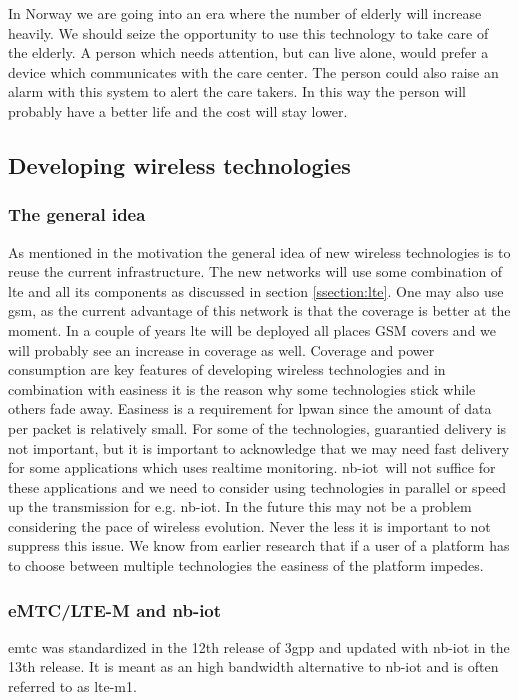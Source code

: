 \documentclass[USenglish]{ifimaster}  %
\begin{document}
In Norway we are going into an era where the number of elderly will increase heavily. We should seize the opportunity to use this technology to take care of the elderly. A person which needs attention, but can live alone, would prefer a device which communicates with the care center. The person could also raise an alarm with this system to alert the care takers. In this way the person will probably have a better life and the cost will stay lower.

\subsection{Developing wireless technologies} \label{ssection:wirelesstech}
\subsubsection{The general idea}
As mentioned in the motivation the general idea of new wireless technologies is to reuse the current infrastructure. The new networks will use some combination of \acrshort{lte} and all its components as discussed in section \vref{ssection:lte}. One may also use \acrshort{gsm}, as the current advantage of this network is that the coverage is better at the moment. In a couple of years \acrshort{lte} will be deployed all places GSM covers and we will probably see an increase in coverage as well. Coverage and power consumption are key features of developing wireless technologies and in combination with easiness it is the reason why some technologies stick while others fade away. Easiness is a requirement for \acrshort{lpwan} since the amount of data per packet is relatively small. For some of the technologies, guarantied delivery is not important, but it is important to acknowledge that we may need fast delivery for some applications which uses realtime monitoring.
\acrshort{nb-iot} will not suffice for these applications and we need to consider using technologies in parallel or speed up the transmission for e.g. \acrshort{nb-iot}. In the future this may not be a problem considering the pace of wireless evolution. Never the less it is important to not suppress this issue. We know from earlier research that if a user of a platform has to choose between multiple technologies the easiness of the platform impedes.

\subsubsection{eMTC/LTE-M and \acrshort{nb-iot}}
\acrfull{emtc} was standardized in the 12th release of \acrshort{3gpp} and updated with \acrshort{nb-iot} in the 13th release. It is meant as an high bandwidth alternative to \acrshort{nb-iot} and is often referred to as \acrshort{lte-m1}.
\end{document}
